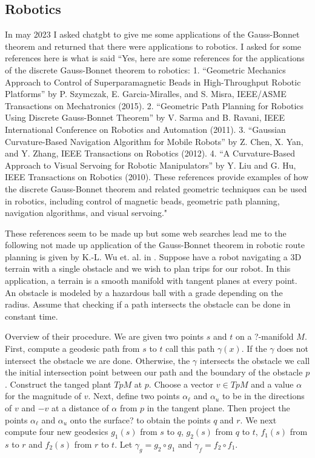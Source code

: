 \subsection{Robotics}
\label{sec:robotics}
In may 2023 I asked chatgbt to give me some applications of the Gauss-Bonnet theorem and returned
that there were applications to robotics. I asked for some references here is what is said
``Yes, here are some references for the applications of the discrete Gauss-Bonnet theorem to robotics: 1. “Geometric Mechanics Approach to Control of Superparamagnetic Beads in High-Throughput Robotic Platforms” by P. Szymczak, E. Garcia-Miralles, and S. Misra, IEEE/ASME Transactions on Mechatronics (2015). 2. “Geometric Path Planning for Robotics Using Discrete Gauss-Bonnet Theorem” by V. Sarma and B. Ravani, IEEE International Conference on Robotics and Automation (2011). 3. “Gaussian Curvature-Based Navigation Algorithm for Mobile Robots” by Z. Chen, X. Yan, and Y. Zhang, IEEE Transactions on Robotics (2012). 4. “A Curvature-Based Approach to Visual Servoing for Robotic Manipulators” by Y. Liu and G. Hu, IEEE Transactions on Robotics (2010). These references provide examples of how the discrete Gauss-Bonnet theorem and related geometric techniques can be used in robotics, including control of magnetic beads, geometric path planning, navigation algorithms, and visual servoing."

These references seem to be made up but some web searches lead me to the following
not made up application of the Gauss-Bonnet theorem in robotic 
route planning is given by K.-L. Wu et. al. in \cite{wu_path_2016}.
Suppose have a robot navigating a 3D terrain with a single obstacle
and we wish to plan trips for our robot.
In this application, a terrain is a smooth manifold  with tangent planes
at every point. An obstacle is modeled by a hazardous ball with a grade depending on the radius.
Assume that checking if a path intersects the obstacle can be done in constant time.


Overview of their procedure.
We are given two points $s$ and $t$ on a ?-manifold $M$.
First, compute a geodesic path from  $s$ to $t$ call this path $\gamma(x)$.
If the $\gamma$ does not intersect the obstacle we are done.
Otherwise, the $\gamma$ intersects the obstacle
we call the initial intersection point between our path
and the boundary of the obstacle $p$.
Construct the tanged plant $TpM$ at $p$.
Choose a vector $v\in TpM$ and a value $\alpha$ for the magnitude of $v$.
Next, define two points $\alpha_{\ell}$ and $\alpha_{u}$
to be in the directions of $v$ and $-v$ at a distance of $\alpha$
from $p$ in the tangent plane. Then project the points   $\alpha_{\ell}$ and $\alpha_{u}$
onto the surface? to obtain the points $q$ and $r$.
We next compute four new  geodesics $g_1(s)$ from $s$ to $q$,
$g_2(s)$ from $q$ to $t$, 
$f_1(s)$ from $s$ to $r$ and 
$f_2(s)$ from $r$ to $t$. Let $\gamma_g=g_2\circ g_1$ and $\gamma_f=f_2\circ f_1$.


